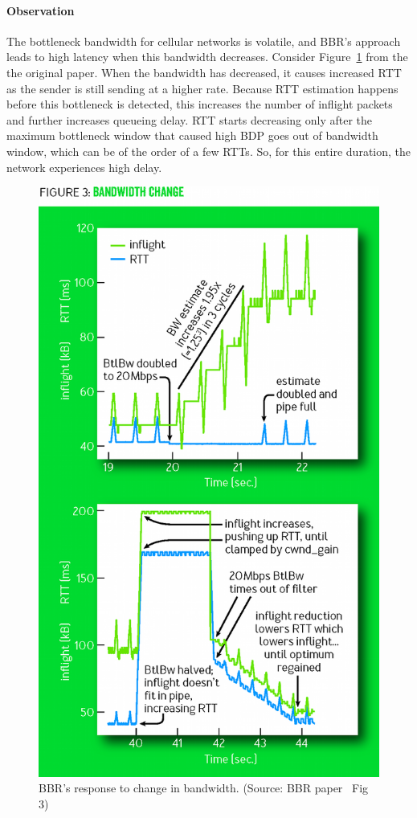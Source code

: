 \documentclass{article}
\begin{document}
\paragraph{Observation} The bottleneck bandwidth for cellular networks
is volatile, and BBR's approach leads to high latency when this
bandwidth decreases. Consider Figure~\ref{bbrdelay} from the the
original paper. When the bandwidth has decreased, it causes increased
RTT as the sender is still sending at a higher rate. Because RTT
estimation happens before this bottleneck is detected, this increases
the number of inflight packets and further increases queueing delay.
RTT starts decreasing only after the maximum bottleneck window that
caused high BDP goes out of bandwidth window, which can be of the
order of a few RTTs. So, for this entire duration, the network
experiences high delay.

\begin{figure}[!h]
\includegraphics[width=0.8\columnwidth]{"bbrdelay"}
\caption{BBR's response to change in bandwidth. (Source: BBR paper~\cite{bbr} Fig 3)}
\label{bbrdelay}
\end{figure}
\end{document}
